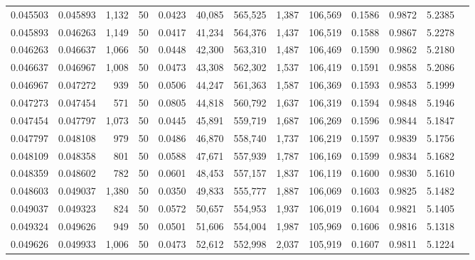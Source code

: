 \begin{tabular}{rrrrrrrrrrrrr}
0.045503 & 0.045893 & 1,132 &  50 &                                     0.0423 &  40,085 & 565,525 &   1,387 & 106,569 & 0.1586 & 0.9872 & 5.2385 \\
0.045893 & 0.046263 & 1,149 &  50 &                                     0.0417 &  41,234 & 564,376 &   1,437 & 106,519 & 0.1588 & 0.9867 & 5.2278 \\
0.046263 & 0.046637 & 1,066 &  50 &                                     0.0448 &  42,300 & 563,310 &   1,487 & 106,469 & 0.1590 & 0.9862 & 5.2180 \\
0.046637 & 0.046967 & 1,008 &  50 &                                     0.0473 &  43,308 & 562,302 &   1,537 & 106,419 & 0.1591 & 0.9858 & 5.2086 \\
0.046967 & 0.047272 &   939 &  50 &                                     0.0506 &  44,247 & 561,363 &   1,587 & 106,369 & 0.1593 & 0.9853 & 5.1999 \\
0.047273 & 0.047454 &   571 &  50 &                                     0.0805 &  44,818 & 560,792 &   1,637 & 106,319 & 0.1594 & 0.9848 & 5.1946 \\
0.047454 & 0.047797 & 1,073 &  50 &                                     0.0445 &  45,891 & 559,719 &   1,687 & 106,269 & 0.1596 & 0.9844 & 5.1847 \\
0.047797 & 0.048108 &   979 &  50 &                                     0.0486 &  46,870 & 558,740 &   1,737 & 106,219 & 0.1597 & 0.9839 & 5.1756 \\
0.048109 & 0.048358 &   801 &  50 &                                     0.0588 &  47,671 & 557,939 &   1,787 & 106,169 & 0.1599 & 0.9834 & 5.1682 \\
0.048359 & 0.048602 &   782 &  50 &                                     0.0601 &  48,453 & 557,157 &   1,837 & 106,119 & 0.1600 & 0.9830 & 5.1610 \\
0.048603 & 0.049037 & 1,380 &  50 &                                     0.0350 &  49,833 & 555,777 &   1,887 & 106,069 & 0.1603 & 0.9825 & 5.1482 \\
0.049037 & 0.049323 &   824 &  50 &                                     0.0572 &  50,657 & 554,953 &   1,937 & 106,019 & 0.1604 & 0.9821 & 5.1405 \\
0.049324 & 0.049626 &   949 &  50 &                                     0.0501 &  51,606 & 554,004 &   1,987 & 105,969 & 0.1606 & 0.9816 & 5.1318 \\
0.049626 & 0.049933 & 1,006 &  50 &                                     0.0473 &  52,612 & 552,998 &   2,037 & 105,919 & 0.1607 & 0.9811 & 5.1224 \\

\end{tabular}
